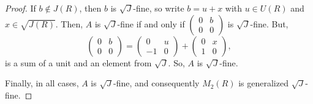 \documentclass[10pt,a4paper]{amsart}
\begin{document}
\begin{proof}
If \( b \not\in J(R) \), then \( b \) is $\sqrt{J}$-fine, so write \( b = u + x \) with \( u \in U(R) \) and \( x \in \sqrt{J(R)} \). Then, \( A \) is $\sqrt{J}$-fine if and only if \( \begin{pmatrix} 0 & b \\ 0 & 0 \end{pmatrix} \) is $\sqrt{J}$-fine. But,
	\[
	\begin{pmatrix} 0 & b \\ 0 & 0 \end{pmatrix}
	= \begin{pmatrix} 0 & u \\ -1 & 0 \end{pmatrix} + \begin{pmatrix} 0 & x \\ 1 & 0 \end{pmatrix},
	\]
is a sum of a unit and an element from $\sqrt{J}$. So, \( A \) is $\sqrt{J}$-fine.
	
Finally, in all cases, \( A \) is $\sqrt{J}$-fine, and consequently \( M_2(R) \) is generalized $\sqrt{J}$-fine.
\end{proof}
\end{document}
